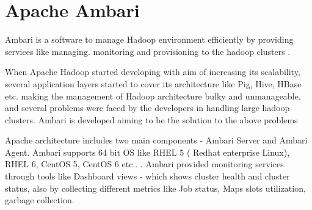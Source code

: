 \section{Apache Ambari}  

Ambari is a software  to manage Hadoop environment
efficiently by providing services like managing. monitoring and provisioning to
the hadoop clusters \cite{hid-sp18-401-wiki-Ambari}.

When Apache Hadoop started developing with aim of increasing its scalability,
several application layers started to cover its architecture like Pig, Hive,
HBase etc. making the management of Hadoop architecture bulky and unmanageable,
and several problems were faced by the developers in handling large hadoop
clusters. Ambari is developed aiming to be the solution to the above problems


Apache architecture includes two main components - Ambari Server and Ambari
Agent. Ambari supports 64 bit OS like RHEL 5 ( Redhat enterprise Linux), RHEL 6,
CentOS 5, CentOS 6 etc.. \cite{hid-sp18-401-Ambari}. Ambari provided monitoring
services through tools like Dashboard views - which shows cluster health and
cluster status, also by collecting different metrics like Job status, Maps slots
utilization, garbage collection.

